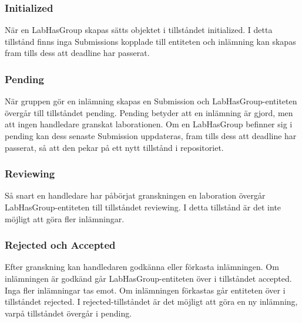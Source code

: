 \subsubsection{Initialized}

När en LabHasGroup skapas sätts objektet i tillståndet initialized. I detta tillstånd finns inga Submissions kopplade till entiteten och inlämning kan skapas fram tills dess att deadline har passerat.

\subsubsection{Pending}

När gruppen gör en inlämning skapas en Submission och LabHasGroup-entiteten övergår till tillståndet pending. Pending betyder att en inlämning är gjord, men att ingen handledare granskat laborationen.
Om en LabHasGroup befinner sig i pending kan dess senaste Submission uppdateras, fram tills dess att deadline har passerat, så att den pekar på ett nytt tillstånd i repositoriet.

\subsubsection{Reviewing}

Så snart en handledare har påbörjat granskningen en laboration övergår LabHasGroup-entiteten till tillståndet reviewing. I detta tillstånd är det inte möjligt att göra fler inlämningar.

\subsubsection{Rejected och Accepted}

Efter granskning kan handledaren godkänna eller förkasta inlämningen. Om inlämningen är godkänd går LabHasGroup-entiteten över i tillståndet accepted. Inga fler inlämningar tas emot. Om inlämningen förkastas går entiteten över i tillståndet rejected. I rejected-tillståndet är det möjligt att göra en ny inlämning, varpå tillståndet övergår i pending.

